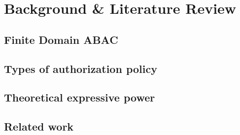 \chapter{Background \& Literature Review}
\section{Finite Domain ABAC}
\section{Types of authorization policy}
\section{Theoretical expressive power}
\section{Related work}